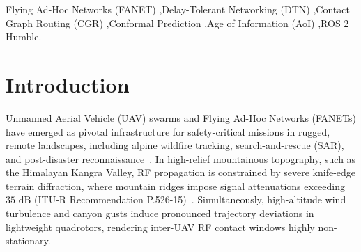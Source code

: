 \documentclass[preprint,12pt,5p,twocolumn]{elsarticle}
\begin{document}
\begin{frontmatter}
\begin{keyword}
Flying Ad-Hoc Networks (FANET) \sep Delay-Tolerant Networking (DTN) \sep Contact Graph Routing (CGR) \sep Conformal Prediction \sep Age of Information (AoI) \sep ROS 2 Humble.
\end{keyword}

\end{frontmatter}

\section{Introduction}
\label{sec:intro}
Unmanned Aerial Vehicle (UAV) swarms and Flying Ad-Hoc Networks (FANETs) have emerged as pivotal infrastructure for safety-critical missions in rugged, remote landscapes, including alpine wildfire tracking, search-and-rescue (SAR), and post-disaster reconnaissance~\cite{bekmezci2013flying, chriki2019fanet}. In high-relief mountainous topography, such as the Himalayan Kangra Valley, RF propagation is constrained by severe knife-edge terrain diffraction, where mountain ridges impose signal attenuations exceeding $35\text{ dB}$ (ITU-R Recommendation P.526-15)~\cite{itur2019p526}. Simultaneously, high-altitude wind turbulence and canyon gusts induce pronounced trajectory deviations in lightweight quadrotors, rendering inter-UAV RF contact windows highly non-stationary.
\end{document}
